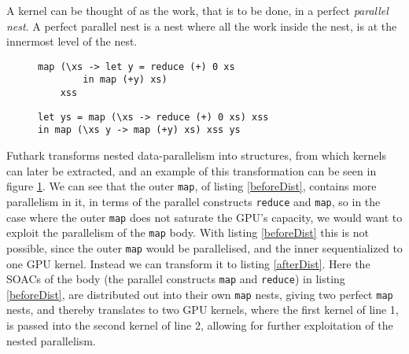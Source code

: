 A kernel can be thought of as the work, that is to be done, in a perfect \textit{parallel nest}. A perfect parallel nest is a nest where all the work inside the nest, is at the innermost level of the nest. 
\begin{figure}
\centering
	\begin{minipage}{0.45\textwidth}
	\centering
	\begin{lstlisting}
map (\xs -> let y = reduce (+) 0 xs 
		in map (+y) xs)
	xss
	\end{lstlisting}
	 \label{beforeDist}
	\end{minipage}\hspace*{\fill}
	\begin{minipage}{0.45\textwidth}
	\centering
	\begin{lstlisting}
let ys = map (\xs -> reduce (+) 0 xs) xss
in map (\xs y -> map (+y) xs) xss ys
	\end{lstlisting}
	 \label{afterDist}
	\end{minipage}
	\label{loopDist}
\end{figure}
\noindent Futhark transforms nested data-parallelism into structures, from which kernels can later be extracted, and an example of this transformation can be seen in figure \ref{loopDist}. We can see that the outer \texttt{map}, of listing \ref{beforeDist}, contains more parallelism in it, in terms of the parallel constructs \texttt{reduce} and \texttt{map}, so in the case where the outer \texttt{map} does not saturate the GPU's capacity, we would want to exploit the parallelism of the \texttt{map} body. With listing \ref{beforeDist} this is not possible, since the outer \texttt{map} would be parallelised, and the inner sequentialized to one GPU kernel. Instead we can transform it to listing \ref{afterDist}. Here the SOACs of the body (the parallel constructs \texttt{map} and \texttt{reduce}) in listing \ref{beforeDist}, are distributed out into their own \texttt{map} nests, giving two perfect \texttt{map} nests, and thereby translates to two GPU kernels, where the first kernel of line 1, is passed into the second kernel of line 2, allowing for further exploitation of the nested parallelism.

